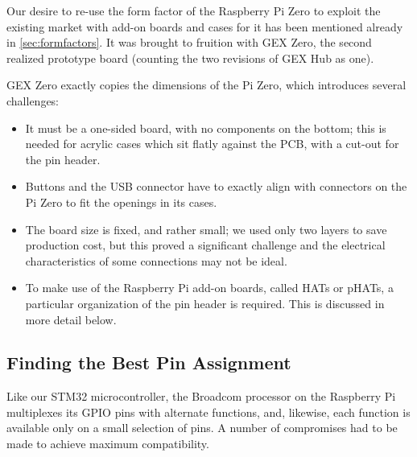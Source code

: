 Our desire to re-use the form factor of the Raspberry Pi Zero to exploit the existing market with add-on boards and cases for it has been mentioned already in \cref{sec:formfactors}. It was brought to fruition with GEX Zero, the second realized prototype board (counting the two revisions of GEX Hub as one).

GEX Zero exactly copies the dimensions of the Pi Zero, which introduces several challenges:

\begin{itemize}
	\item It must be a one-sided board, with no components on the bottom; this is needed for acrylic cases which sit flatly against the \gls{PCB}, with a cut-out for the pin header.
	\item Buttons and the USB connector have to exactly align with connectors on the Pi Zero to fit the openings in its cases.
	\item The board size is fixed, and rather small; we used only two layers to save production cost, but this proved a significant challenge and the electrical characteristics of some connections may not be ideal.
	\item To make use of the Raspberry Pi add-on boards, called HATs or pHATs, a particular organization of the pin header is required. This is discussed in more detail below.
\end{itemize}

\subsection{Finding the Best Pin Assignment}

Like our STM32 microcontroller, the Broadcom processor on the Raspberry Pi multiplexes its \gls{GPIO} pins with alternate functions, and, likewise, each function is available only on a small selection of pins. A number of compromises had to be made to achieve maximum compatibility.



